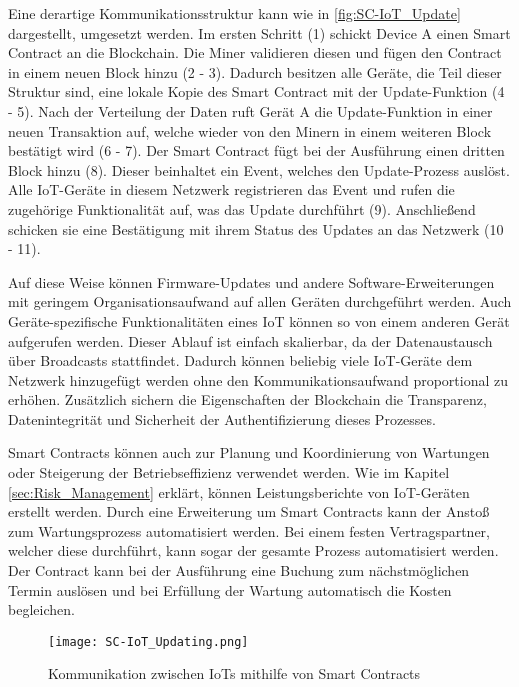 Eine derartige Kommunikationsstruktur kann wie in \autoref{fig:SC-IoT_Update} dargestellt, umgesetzt werden.
Im ersten Schritt (1) schickt Device A einen Smart Contract an die Blockchain. Die Miner validieren diesen
und fügen den Contract in einem neuen Block hinzu (2 - 3). Dadurch besitzen alle Geräte, die Teil dieser 
Struktur sind, eine lokale Kopie des Smart Contract mit der Update-Funktion (4 - 5).
Nach der Verteilung der Daten ruft Gerät A die Update-Funktion in einer neuen Transaktion auf, welche 
wieder von den Minern in einem weiteren Block bestätigt wird (6 - 7). 
Der Smart Contract fügt bei der Ausführung einen dritten Block hinzu (8). Dieser beinhaltet ein Event,
welches den Update-Prozess auslöst.
Alle IoT-Geräte in diesem Netzwerk registrieren das Event und rufen die zugehörige Funktionalität auf, was
das Update durchführt (9). 
Anschließend schicken sie eine Bestätigung mit ihrem Status des Updates an das Netzwerk (10 - 11).

Auf diese Weise können Firmware-Updates und andere Software-Erweiterungen mit geringem Organisationsaufwand auf allen 
Geräten durchgeführt werden. 
Auch Geräte-spezifische Funktionalitäten eines IoT können so von einem anderen Gerät aufgerufen werden.
Dieser Ablauf ist einfach skalierbar, da der Datenaustausch über Broadcasts stattfindet.  
Dadurch können beliebig viele IoT-Geräte dem Netzwerk hinzugefügt werden ohne den Kommunikationsaufwand 
proportional zu erhöhen. 
Zusätzlich sichern die Eigenschaften der Blockchain die Transparenz, Datenintegrität und Sicherheit der
Authentifizierung dieses Prozesses.
\cite[p.~74f]{Choi2018DeviceControl}


Smart Contracts können auch zur Planung und Koordinierung von Wartungen oder Steigerung der Betriebseffizienz 
verwendet werden.
Wie im Kapitel \ref{sec:Risk_Management} erklärt, können Leistungsberichte von IoT-Geräten erstellt werden.
Durch eine Erweiterung um Smart Contracts kann der Anstoß zum Wartungsprozess automatisiert werden. Bei einem
festen Vertragspartner, welcher diese durchführt, kann sogar der gesamte Prozess automatisiert werden. 
Der Contract kann bei der Ausführung eine Buchung zum nächstmöglichen Termin auslösen und bei Erfüllung 
der Wartung automatisch die Kosten begleichen.
\cite[p.~169ff]{chowdhary2025smart}

\begin{figure}[!h]
    \begin{center}
        \texttt{[image: SC-IoT\_Updating.png]}
    \end{center}
    \caption{Kommunikation zwischen IoTs mithilfe von Smart Contracts}
    \label{fig:SC-IoT_Update}
\end{figure}



